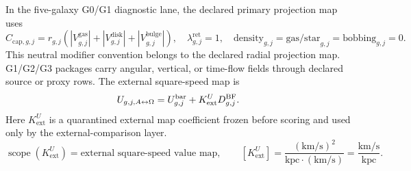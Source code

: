 In the five-galaxy G0/G1 diagnostic lane, the declared primary projection map uses
\[
C_{\mathrm{cap},g,j}=r_{g,j}
\left(|V^{\mathrm{gas}}_{g,j}|+|V^{\mathrm{disk}}_{g,j}|+|V^{\mathrm{bulge}}_{g,j}|\right),
\quad
\lambda^{\mathrm{ret}}_{g,j}=1,
\quad
\mathrm{density}_{g,j}=\mathrm{gas/star}_{g,j}=\mathrm{bobbing}_{g,j}=0.
\]
This neutral modifier convention belongs to the declared radial projection map. G1/G2/G3 packages carry angular, vertical, or time-flow fields through declared source or proxy rows.
The external square-speed map is
\[
U_{g,j,A{\leftrightarrow}\Omega}
=
U^{\mathrm{bar}}_{g,j}+K^U_{\mathrm{ext}}D^{\mathrm{BF}}_{g,j}.
\]
Here \(K^U_{\mathrm{ext}}\) is a quarantined external map coefficient frozen before scoring and used only by the external-comparison layer.
\[
\operatorname{scope}(K^U_{\mathrm{ext}})=\text{external square-speed value map},
\qquad
[K^U_{\mathrm{ext}}]=\frac{(\mathrm{km/s})^2}{\mathrm{kpc}\cdot(\mathrm{km/s})}=\frac{\mathrm{km/s}}{\mathrm{kpc}}.
\]



